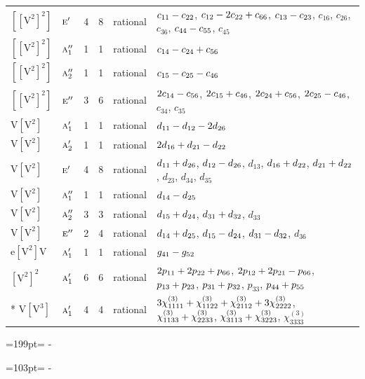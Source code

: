 \documentclass[10pt,a4paper]{article}
\newcommand{\needspace}[1]{\par\penalty-100\begingroup\dimen0=#1\relax\dimen2=\pagegoal
  \advance\dimen2-\pagetotal\ifdim\dimen0>\dimen2\relax\ifdim\dimen2>0pt\vfil\break\fi\fi
  \endgroup}
\numberwithin{equation}{section}
\newcommand{\irr}[1]{\text{\normalfont\scshape #1}}
\newcommand{\jahn}[1]{\mathrm{#1}}
\newlength{\fillwidth}\newlength{\cellwidth}\newlength{\colwidth}
\newcommand{\signbreak}{\penalty100\relax}
\begin{document}
{\begin{longtable}{@{}llrrl>{\RaggedRight\arraybackslash}p{\fillwidth}@{}}
$\jahn{[[V^{2}]^{2}]}$ & $\irr{e}'$ & 4 & 8 & rational & $c_{11} -\signbreak c_{22}$, $c_{12} -\signbreak 2c_{22} +\signbreak c_{66}$, $c_{13} -\signbreak c_{23}$, $c_{16}$, $c_{26}$, $c_{36}$, $c_{44} -\signbreak c_{55}$, $c_{45}$\\
$\jahn{[[V^{2}]^{2}]}$ & $\irr{a}_{1}''$ & 1 & 1 & rational & $c_{14} -\signbreak c_{24} +\signbreak c_{56}$\\
$\jahn{[[V^{2}]^{2}]}$ & $\irr{a}_{2}''$ & 1 & 1 & rational & $c_{15} -\signbreak c_{25} -\signbreak c_{46}$\\
$\jahn{[[V^{2}]^{2}]}$ & $\irr{e}''$ & 3 & 6 & rational & $2c_{14} -\signbreak c_{56}$, $2c_{15} +\signbreak c_{46}$, $2c_{24} +\signbreak c_{56}$, $2c_{25} -\signbreak c_{46}$, $c_{34}$, $c_{35}$\\
$\jahn{V[V^{2}]}$ & $\irr{a}_{1}'$ & 1 & 1 & rational & $d_{11} -\signbreak d_{12} -\signbreak 2d_{26}$\\
$\jahn{V[V^{2}]}$ & $\irr{a}_{2}'$ & 1 & 1 & rational & $2d_{16} +\signbreak d_{21} -\signbreak d_{22}$\\
$\jahn{V[V^{2}]}$ & $\irr{e}'$ & 4 & 8 & rational & $d_{11} +\signbreak d_{26}$, $d_{12} -\signbreak d_{26}$, $d_{13}$, $d_{16} +\signbreak d_{22}$, $d_{21} +\signbreak d_{22}$, $d_{23}$, $d_{34}$, $d_{35}$\\
$\jahn{V[V^{2}]}$ & $\irr{a}_{1}''$ & 1 & 1 & rational & $d_{14} -\signbreak d_{25}$\\
$\jahn{V[V^{2}]}$ & $\irr{a}_{2}''$ & 3 & 3 & rational & $d_{15} +\signbreak d_{24}$, $d_{31} +\signbreak d_{32}$, $d_{33}$\\
$\jahn{V[V^{2}]}$ & $\irr{e}''$ & 2 & 4 & rational & $d_{14} +\signbreak d_{25}$, $d_{15} -\signbreak d_{24}$, $d_{31} -\signbreak d_{32}$, $d_{36}$\\
$\jahn{e[V^{2}]V}$ & $\irr{a}_{1}'$ & 1 & 1 & rational & $\mathnormal{g}_{41} -\signbreak \mathnormal{g}_{52}$\\
$\jahn{[V^{2}]^{2}}$ & $\irr{a}_{1}'$ & 6 & 6 & rational & $2p_{11} +\signbreak 2p_{22} +\signbreak p_{66}$, $2p_{12} +\signbreak 2p_{21} -\signbreak p_{66}$, $p_{13} +\signbreak p_{23}$, $p_{31} +\signbreak p_{32}$, $p_{33}$, $p_{44} +\signbreak p_{55}$\\*
$\jahn{V[V^{3}]}$ & $\irr{a}_{1}'$ & 4 & 4 & rational & $3\chi^{(3)}_{1111} +\signbreak \chi^{(3)}_{1122} +\signbreak \chi^{(3)}_{2112} +\signbreak 3\chi^{(3)}_{2222}$, $\chi^{(3)}_{1133} +\signbreak \chi^{(3)}_{2233}$, $\chi^{(3)}_{3113} +\signbreak \chi^{(3)}_{3223}$, $\chi^{(3)}_{3333}$\\
\bottomrule\end{longtable}}
\needspace{199pt}
\needspace{103pt}
\end{document}
